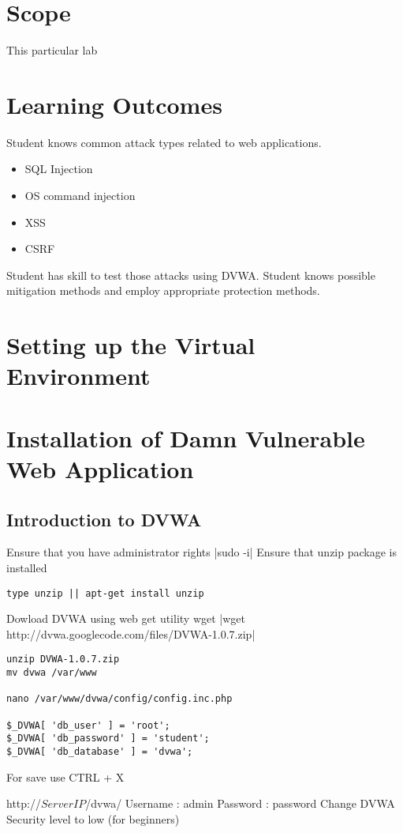 \section{Scope}
This particular lab 
\section{Learning Outcomes}
Student knows common attack types related to web applications.
\begin{itemize}
	\item SQL Injection
	\item OS command injection
	\item  \gls{XSS}
	\item  \gls{CSRF}
\end{itemize} Student has skill to test those attacks using \gls{DVWA}.
Student knows possible mitigation methods and employ appropriate protection methods.
\section{Setting up the Virtual Environment}
\section{Installation of Damn Vulnerable Web Application}
\subsection{Introduction to DVWA}

Ensure that you have administrator rights
|sudo -i|
Ensure that unzip package is installed
\begin{verbatim}
type unzip || apt-get install unzip
\end{verbatim}
Dowload DVWA using web get utility wget
|wget http://dvwa.googlecode.com/files/DVWA-1.0.7.zip|

\begin{verbatim}
unzip DVWA-1.0.7.zip
mv dvwa /var/www

nano /var/www/dvwa/config/config.inc.php

$_DVWA[ 'db_user' ] = 'root';
$_DVWA[ 'db_password' ] = 'student';
$_DVWA[ 'db_database' ] = 'dvwa';
\end{verbatim}
For save use  CTRL + X


http://$ServerIP$/dvwa/
Username : admin
Password : password
Change DVWA Security level to low (for beginners)

